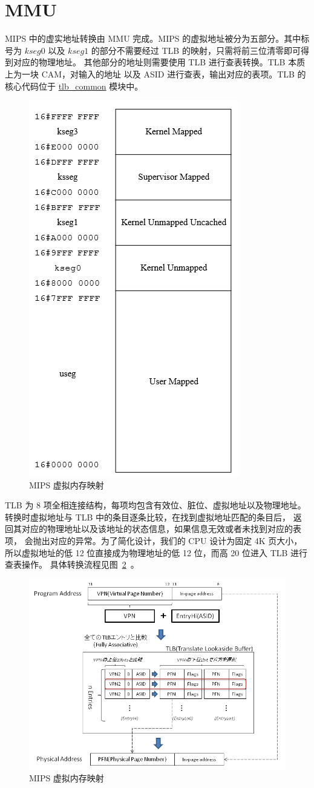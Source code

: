 \documentclass[blue,normal,cn,hide]{elegantbook}
\begin{document}
\section{MMU}
MIPS 中的虚实地址转换由 MMU 完成。MIPS 的虚拟地址被分为五部分。其中标号为 $kseg0$ 
以及 $kseg1$ 的部分不需要经过 TLB 的映射，只需将前三位清零即可得到对应的物理地址。
其他部分的地址则需要使用 TLB 进行查表转换。TLB 本质上为一块 CAM，对输入的地址
以及 ASID 进行查表，输出对应的表项。TLB 的核心代码位于 \href{https://github.com/name1e5s/Sirius/blob/SiriusG/tlb\_common.sv}{tlb\_common} 
模块中。

\begin{figure}[htpb]
    \centering
    \includegraphics[width=.4\textwidth]{figures/VirtualAddress}
    \caption{MIPS 虚拟内存映射}
    \label{fig:VirtualAddress}
\end{figure}


TLB 为 8 项全相连接结构，每项均包含有效位、脏位、虚拟地址以及物理地址。
转换时虚拟地址与 TLB 中的条目逐条比较，在找到虚拟地址匹配的条目后，
返回其对应的物理地址以及该地址的状态信息，如果信息无效或者未找到对应的表项，
会抛出对应的异常。为了简化设计，我们的 CPU 设计为固定 4K 页大小，
所以虚拟地址的低 12 位直接成为物理地址的低 12 位，而高 20 位进入 TLB 进行查表操作。
具体转换流程见图~\ref{fig:TLBTran}~。

\begin{figure}[htpb]
    \centering
    \includegraphics[width=.9\textwidth]{figures/TLBTran}
    \caption{MIPS 虚拟内存映射}
    \label{fig:TLBTran}
\end{figure}
\end{document}
